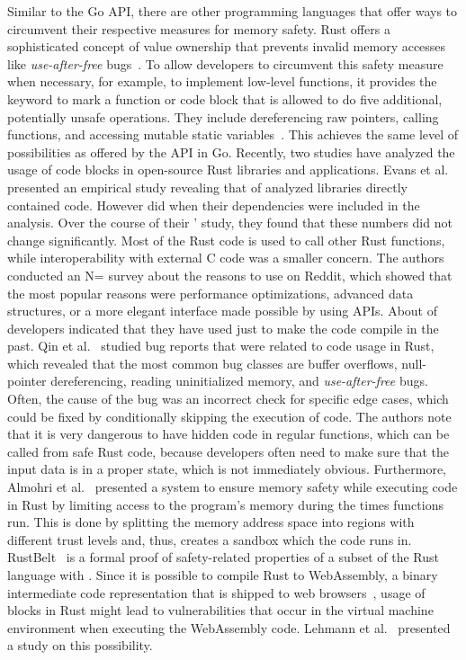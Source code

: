 Similar to the Go \unsafe{} \acrshort{API}, there are other programming languages that offer ways to circumvent their
respective measures for memory safety.
Rust offers a sophisticated concept of value ownership that prevents invalid memory accesses like
\textit{use-after-free} bugs~\cite{matsakis2014}.
To allow developers to circumvent this safety measure when necessary, for example, to implement low-level functions, it
provides the \unsafe{} keyword to mark a function or code block that is allowed to do five additional, potentially
unsafe operations.
They include dereferencing raw pointers, calling \unsafe{} functions, and accessing mutable static
variables~\cite{matsakis2014}.
This achieves the same level of possibilities as offered by the \unsafe{} \acrshort{API} in Go.
Recently, two studies have analyzed the usage of \unsafe{} code blocks in open-source Rust libraries and applications.
Evans et al.~\cite{evans2020} presented an empirical study revealing that  of analyzed
libraries directly contained \unsafe{} code.
However  did when their dependencies were included in the analysis.
Over the course of their ' study, they found that these numbers did not change significantly.
Most of the \unsafe{} Rust code is used to call other Rust functions, while interoperability with external C code was a
smaller concern.
The authors conducted an N= survey about the reasons to use \unsafe{} on Reddit, which showed that the most
popular reasons were performance optimizations, advanced data structures, or a more elegant interface made possible by
using \unsafe{} \acrshort{API}s.
About  of developers indicated that they have used \unsafe{} just to make the code compile in the past.
Qin et al.~\cite{qin2020} studied bug reports that were related to \unsafe{} code usage in Rust, which revealed that the
most common bug classes are buffer overflows, null-pointer dereferencing, reading uninitialized memory, and
\textit{use-after-free} bugs.
Often, the cause of the bug was an incorrect check for specific edge cases, which could be fixed by conditionally
skipping the execution of \unsafe{} code.
The authors note that it is very dangerous to have hidden \unsafe{} code in regular functions, which can be called from
safe Rust code, because developers often need to make sure that the input data is in a proper state, which is not
immediately obvious.
Furthermore, Almohri et al.~\cite{almohri2018} presented a system to ensure memory safety while executing \unsafe{} code
in Rust by limiting access to the program's memory during the times \unsafe{} functions run.
This is done by splitting the memory address space into regions with different trust levels and, thus, creates a sandbox
which the \unsafe{} code runs in.
RustBelt~\cite{jung2017} is a formal proof of safety-related properties of a subset of the Rust language with \unsafe{}.
Since it is possible to compile Rust to WebAssembly, a binary intermediate code representation that is shipped to web
browsers~\cite{rourke2018}, usage of \unsafe{} blocks in Rust might lead to vulnerabilities that occur in the virtual
machine environment when executing the WebAssembly code.
Lehmann et al.~\cite{lehmann2020} presented a study on this possibility.

